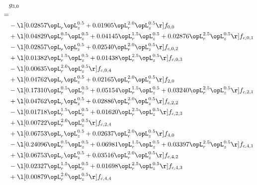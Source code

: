 \begin{alignat}{2} 
\label{eq:g_30_0} 
& g_{3,0} \nonumber \\ 
 = \\ 
& - \l[  0.02857 \opL_r \opL_z^{0.5} +  0.01905 \opL_r^{2.0} \opL_z^{0.5}  \r] f_{0,0} \nonumber \\ 
& + \l[  0.04829 \opL_r^{0.5} \opL_z^{0.5} +  0.04145 \opL_r^{1.5} \opL_z^{0.5} +  0.02876 \opL_r^{2.5} \opL_z^{0.5}  \r] f_{c,0,1} \nonumber \\ 
& - \l[  0.02857 \opL_r \opL_z^{0.5} +  0.02540 \opL_r^{2.0} \opL_z^{0.5}  \r] f_{c,0,2} \nonumber \\ 
& + \l[  0.01382 \opL_r^{1.5} \opL_z^{0.5} +  0.01438 \opL_r^{2.5} \opL_z^{0.5}  \r] f_{c,0,3} \nonumber \\ 
& - \l[  0.00635 \opL_r^{2.0} \opL_z^{0.5}  \r] f_{c,0,4} \nonumber \\ 
& + \l[  0.04762 \opL_r \opL_z^{0.5} +  0.02165 \opL_r^{2.0} \opL_z^{0.5}  \r] f_{2,0} \nonumber \\ 
& - \l[  0.17310 \opL_r^{0.5} \opL_z^{0.5} +  0.05154 \opL_r^{1.5} \opL_z^{0.5} +  0.03240 \opL_r^{2.5} \opL_z^{0.5}  \r] f_{c,2,1} \nonumber \\ 
& + \l[  0.04762 \opL_r \opL_z^{0.5} +  0.02886 \opL_r^{2.0} \opL_z^{0.5}  \r] f_{c,2,2} \nonumber \\ 
& - \l[  0.01718 \opL_r^{1.5} \opL_z^{0.5} +  0.01620 \opL_r^{2.5} \opL_z^{0.5}  \r] f_{c,2,3} \nonumber \\ 
& + \l[  0.00722 \opL_r^{2.0} \opL_z^{0.5}  \r] f_{c,2,4} \nonumber \\ 
& + \l[  0.06753 \opL_r \opL_z^{0.5} +  0.02637 \opL_r^{2.0} \opL_z^{0.5}  \r] f_{4,0} \nonumber \\ 
& - \l[  0.24096 \opL_r^{0.5} \opL_z^{0.5} +  0.06981 \opL_r^{1.5} \opL_z^{0.5} +  0.03397 \opL_r^{2.5} \opL_z^{0.5}  \r] f_{c,4,1} \nonumber \\ 
& + \l[  0.06753 \opL_r \opL_z^{0.5} +  0.03516 \opL_r^{2.0} \opL_z^{0.5}  \r] f_{c,4,2} \nonumber \\ 
& - \l[  0.02327 \opL_r^{1.5} \opL_z^{0.5} +  0.01698 \opL_r^{2.5} \opL_z^{0.5}  \r] f_{c,4,3} \nonumber \\ 
& + \l[  0.00879 \opL_r^{2.0} \opL_z^{0.5}  \r] f_{c,4,4} \nonumber \\ 
\end{alignat} 


